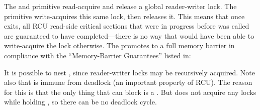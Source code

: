 The  and  primitive read-acquire
and release a global reader-writer lock.
The 
primitive write-acquires this same lock, then releases it.
This means
that once  exits, all RCU read-side critical sections
that were in progress before  was called are guaranteed
to have completed---there is no way that  would have
been able to write-acquire the lock otherwise.
The 
promotes  to a full memory barrier in compliance with
the ``Memory-Barrier Guarantees'' listed in:

\begin{quote}
\end{quote}

It is possible to nest , since reader-writer locks may
be recursively acquired.
Note also that  is immune
from deadlock (an important property of RCU\@).
The reason for this is
that the only thing that can block  is a .
But  does not acquire any locks while holding ,
so there can be no deadlock cycle.


